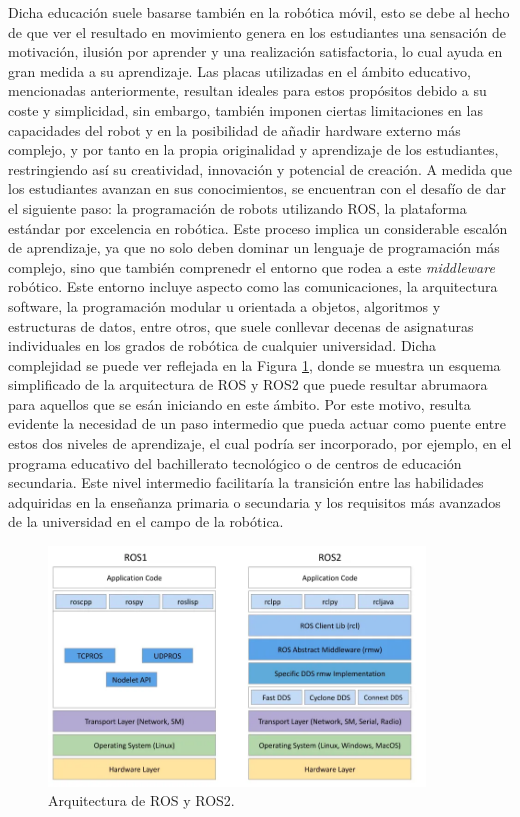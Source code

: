 Dicha educación suele basarse también en la robótica móvil, esto se debe al
hecho de que ver el resultado en movimiento genera en los estudiantes una
sensación de motivación, ilusión por aprender y una realización satisfactoria,
lo cual ayuda en gran medida a su aprendizaje.
Las placas utilizadas en el ámbito educativo, mencionadas anteriormente,
resultan ideales para estos propósitos debido a su coste y simplicidad, sin
embargo, también imponen ciertas limitaciones en las capacidades del robot y en
la posibilidad de añadir hardware externo más complejo, y por tanto en la propia
originalidad y aprendizaje de los estudiantes, restringiendo así su creatividad,
innovación y potencial de creación.
A medida que los estudiantes avanzan en sus conocimientos, se encuentran con el
desafío de dar el siguiente paso: la programación de robots utilizando ROS, la
plataforma estándar por excelencia en robótica. Este proceso implica un
considerable escalón de aprendizaje, ya que no solo deben dominar un lenguaje de
programación más complejo, sino que también comprenedr el entorno que
rodea a este \textit{middleware} robótico.
Este entorno incluye aspecto como las comunicaciones, la arquitectura software,
la programación modular u orientada a objetos, algoritmos y estructuras de
datos, entre otros, que suele conllevar decenas de asignaturas individuales en
los grados de robótica de cualquier universidad.
Dicha complejidad se puede ver reflejada en la Figura \ref{fig:ros}, donde se
muestra un esquema simplificado de la arquitectura de ROS y ROS2 que puede
resultar abrumaora para aquellos que se esán iniciando en este ámbito.
Por este motivo, resulta evidente la necesidad de un paso intermedio que pueda
actuar como puente entre estos dos niveles de aprendizaje, el cual podría ser
incorporado, por ejemplo, en el programa educativo del bachillerato tecnológico
o de centros de educación secundaria.
Este nivel intermedio facilitaría la transición entre las habilidades adquiridas
en la enseñanza primaria o secundaria y los requisitos más avanzados de la
universidad en el campo de la robótica.

\begin{figure} [h!]
  \begin{center}
    \includegraphics[width=10cm]{figs/ROS_and_ROS2}
  \end{center}
  \caption{Arquitectura de ROS y ROS2.}
  \label{fig:ros}
\end{figure}\

